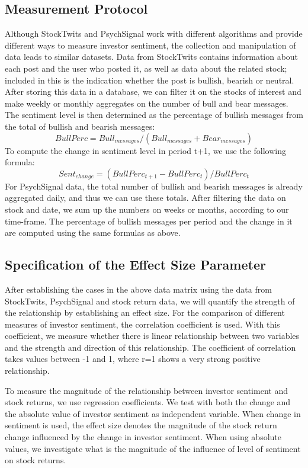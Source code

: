 \newpage

\subsection{Measurement Protocol}
Although StockTwits and PsychSignal work with different algorithms and provide different ways to measure investor sentiment, the collection and manipulation of data leads to similar datasets. Data from StockTwits contains information about each post and the user who posted it, as well as data about the related stock; included in this is the indication whether the post is bullish, bearish or neutral. After storing this data in a database, we can filter it on the stocks of interest and make weekly or monthly aggregates on the number of bull and bear messages. The sentiment level is then determined as the percentage of bullish messages from the total of bullish and bearish messages:
\begin{equation}
BullPerc = Bull_{messages} / (Bull_{messages} + Bear_{messages})
\end{equation}
To compute the change in sentiment level in period t+1, we use the following formula:
\begin{equation}
Sent_{change} = (BullPerc_{t+1} - BullPerc_t ) / BullPerc_t
\end{equation}
For PsychSignal data, the total number of bullish and bearish messages is already aggregated daily, and thus we can use these totals. After filtering the data on stock and date, we sum up the numbers on weeks or months, according to our time-frame. The percentage of bullish messages per period and the change in it are computed using the same formulas as above.

\subsection{Specification of the Effect Size Parameter} \label{effect size parameter}
After establishing the cases in the above data matrix using the data from StockTwits, PsychSignal and stock return data, we will quantify the strength of the relationship by establishing an effect size. For the comparison of different measures of investor sentiment, the correlation coefficient is used. With this coefficient, we measure whether there is linear relationship between two variables and the strength and direction of this relationship. The coefficient of correlation takes values between -1 and 1, where r=1 shows a very strong positive relationship. 
\par
To measure the magnitude of the relationship between investor sentiment and stock returns, we use regression coefficients. We test with both the change and the absolute value of investor sentiment as independent variable. When change in sentiment is used, the effect size denotes the magnitude of the stock return change influenced by the change in investor sentiment. When using absolute values, we investigate what is the magnitude of the influence of level of sentiment on stock returns.